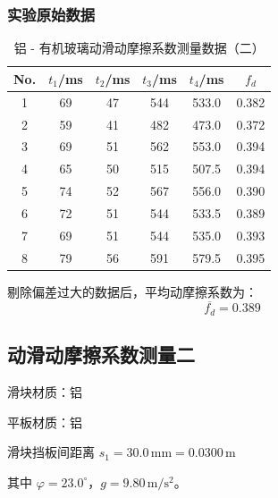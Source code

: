 \subsubsection{实验原始数据}
\begin{table}[h!]
    \centering
    \renewcommand{\arraystretch}{1.5}
    \setlength{\tabcolsep}{8pt}
    \begin{tabular}{|c|c|c|c|c|c|}
    \hline
    \textbf{No.} & $t_1$/ms & $t_2$/ms & $t_3$/ms & $t_4$/ms & $f_d$ \\ \hline
    1 & 69 & 47 & 544 & 533.0 & 0.382 \\ \hline
    2 & 59 & 41 & 482 & 473.0 & 0.372 \\ \hline
    3 & 69 & 51 & 562 & 553.0 & 0.394 \\ \hline
    4 & 65 & 50 & 515 & 507.5 & 0.394 \\ \hline
    5 & 74 & 52 & 567 & 556.0 & 0.390 \\ \hline
    6 & 72 & 51 & 544 & 533.5 & 0.389 \\ \hline
    7 & 69 & 51 & 544 & 535.0 & 0.393 \\ \hline
    8 & 79 & 56 & 591 & 579.5 & 0.395 \\ \hline
    \end{tabular}
    \caption{铝 - 有机玻璃动滑动摩擦系数测量数据（二）}
    \label{tab:dynamic_friction_data2}
\end{table}

剔除偏差过大的数据后，平均动摩擦系数为：
$$
\overline{f_d} =0.389
$$

\subsection{动滑动摩擦系数测量二}

滑块材质：铝

平板材质：铝

滑块挡板间距离 $s_1=30.0\,\mathrm{mm}=0.0300\,\mathrm{m}$

其中 $\varphi=23.0^\circ$，$g=9.80\,\mathrm{m/s^2}$。

